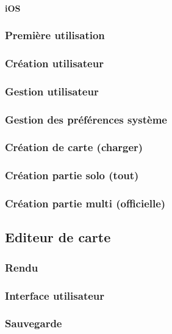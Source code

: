 			
		\paragraph{iOS}
				
	\subsubsection{Première utilisation}
	\subsubsection{Création utilisateur}
	\subsubsection{Gestion utilisateur}
	\subsubsection{Gestion des préférences système}
	\subsubsection{Création de carte (charger)}
	\subsubsection{Création partie solo (tout)}
	\subsubsection{Création partie multi (officielle)}
			

\subsection{Editeur de carte}

	\hypertarget{Editeur de carte}{}
	\label{Editeur de carte}

	\subsubsection{Rendu}
		\subsubsection{Interface utilisateur}
		\subsubsection{Sauvegarde}


